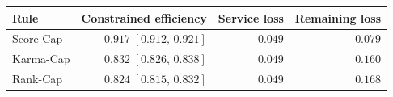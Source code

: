 \begin{tabular}{lrrr}
\toprule
Rule & Constrained efficiency & Service loss & Remaining loss \\
\midrule
Score-Cap & \(0.917\;[0.912,\,0.921]\) & \(0.049\) & \(0.079\) \\
Karma-Cap & \(0.832\;[0.826,\,0.838]\) & \(0.049\) & \(0.160\) \\
Rank-Cap & \(0.824\;[0.815,\,0.832]\) & \(0.049\) & \(0.168\) \\
\bottomrule
\end{tabular}
